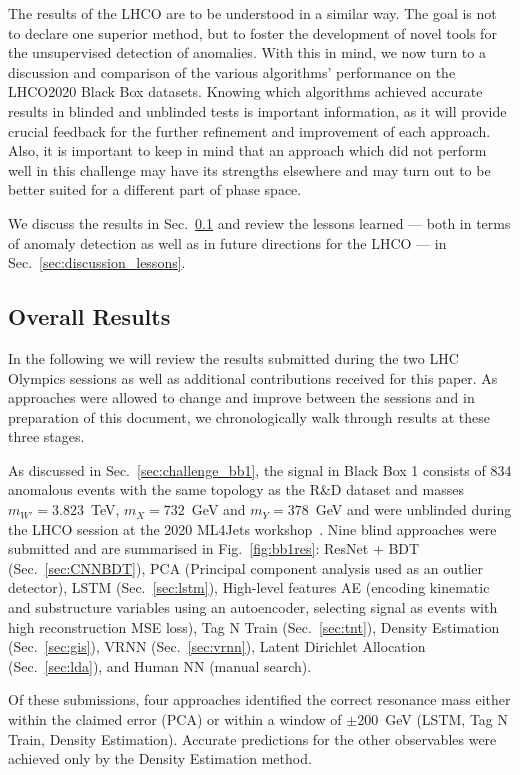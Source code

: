\documentclass[a4paper,11pt]{article}
\begin{document}
\noindent The results of the LHCO are to be understood in a similar way. The goal is not to declare one superior method, but to foster the development of novel tools for the unsupervised detection of anomalies. With this in mind, we now turn to a discussion and comparison of the various algorithms' performance on the LHCO2020 Black Box datasets. Knowing which algorithms achieved accurate results in blinded and unblinded tests is important information, as it will provide crucial feedback for the further refinement and improvement of each approach. Also, it is important to keep in mind that an approach which did not perform well in this challenge may have its strengths elsewhere and may turn out to be better suited for a different part of phase space. 

We discuss the results in Sec.~\ref{sec:discussion_overall} and review the lessons learned --- both in terms of anomaly detection as well as in future directions for the LHCO  --- in Sec.~\ref{sec:discussion_lessons}.

\subsection{Overall Results}
\label{sec:discussion_overall}

In the following we will review the results submitted during the two LHC Olympics sessions as well as additional contributions received for this paper. As approaches were allowed to change and improve between the sessions and in preparation of this document, we chronologically walk through  results at these three stages.

As discussed in Sec.~\ref{sec:challenge_bb1}, the signal in Black Box 1 consists of 834 anomalous events with the same topology as the R\&D dataset and masses $m_{W'}=3.823$~TeV, $m_{X}=732$~GeV and $m_Y=378$~GeV and were unblinded during the LHCO session at the 2020 ML4Jets workshop~\cite{winterolympics}. Nine blind approaches were submitted and are summarised in Fig.~\ref{fig:bb1res}:
ResNet + BDT (Sec.~\ref{sec:CNNBDT}), 
PCA (Principal component analysis used as an outlier detector), 
LSTM (Sec.~\ref{sec:lstm}), 
High-level features AE (encoding kinematic and substructure variables using an autoencoder, selecting signal as events with high reconstruction MSE loss), 
Tag N Train (Sec.~\ref{sec:tnt}), 
Density Estimation (Sec.~\ref{sec:gis}), 
VRNN (Sec.~\ref{sec:vrnn}), 
Latent Dirichlet Allocation (Sec.~\ref{sec:lda}), 
and Human NN (manual search).

Of these submissions, four approaches identified the correct resonance mass either within the claimed error (PCA) or within a window of $\pm 200$~GeV (LSTM, Tag N Train, Density Estimation). Accurate predictions for the other observables were achieved only by the Density Estimation method.
\end{document}
